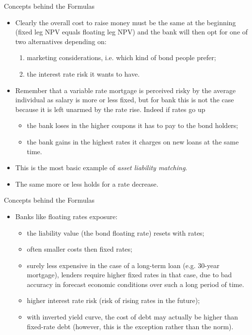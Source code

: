 \documentclass{beamer}
\begin{document}
\begin{frame}{Concepts behind the Formulas}
	\begin{itemize}
		\item<1-> Clearly the overall cost to raise money must be the same at the beginning (fixed leg NPV equals floating leg NPV) and the bank will then opt for one of two alternatives depending on:
		\begin{enumerate}
			\item marketing considerations, i.e. which kind of bond people prefer;
			\item the interest rate risk it wants to have.
		\end{enumerate} 
		\item<2-> Remember that a variable rate mortgage is perceived risky by the average individual as salary is more or less fixed, but for bank this is not the case because it is left unarmed by the rate rise. Indeed if rates go up
		\begin{itemize}
			\item the bank loses in the higher coupons it has to pay to the bond holders;
			\item the bank gains in the highest rates it charges on new loans at the same time.
		\end{itemize}
		\item<3-> This is the most basic example of \emph{asset liability matching}.
		\item<4-> The same more or less holds for a rate decrease.%
	\end{itemize}
\end{frame}

\begin{frame}{Concepts behind the Formulas}
	\begin{itemize}
		\item Banks like floating rates exposure: 
		\begin{itemize}
			\item [\goodcheck] the liability value (the bond floating rate) resets with rates;
			\item [\goodcheck] often smaller costs then fixed rates;
			\item [\goodcheck]surely less expensive in the case of a long-term loan (e.g. 30-year mortgage), lenders require higher fixed rates in that case, due to bad accuracy in forecast economic conditions over such a long period of time.
		\end{itemize}
		\begin{itemize}
			\item [\badcheck] higher interest rate risk (risk of rising rates in the future);
			\item [\badcheck] with inverted yield curve, the cost of debt may actually be higher than fixed-rate debt (however, this is the exception rather than the norm).
		\end{itemize}
	\end{itemize}
\end{frame}
\end{document}
